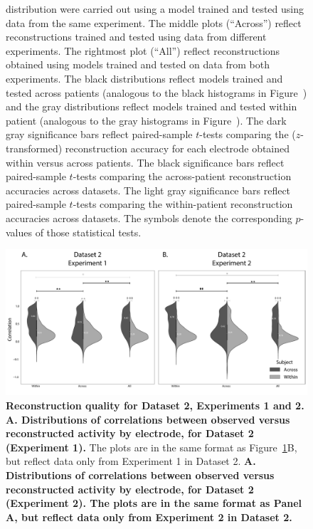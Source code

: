 \documentclass[10pt]{article}
\begin{document}
\begin{figure}[p]
{  distribution were carried out using a model trained and tested using
  data from the same experiment.  The middle plots (``Across'')
  reflect reconstructions trained and tested using data from different
  experiments.  The rightmost plot (``All'') reflect reconstructions
  obtained using models trained and tested on data from both
  experiments.  The black distributions reflect models trained and
  tested across patients (analogous to the black histograms in
  Figure~\corrmaps) and the gray distributions reflect models trained
  and tested within patient (analogous to the gray histograms in
  Figure~\corrmaps).  The dark gray significance bars reflect
  paired-sample $t$-tests comparing the ($z$-transformed)
  reconstruction accuracy for each electrode obtained within versus
  across patients.  The black significance bars reflect paired-sample
  $t$-tests comparing the across-patient reconstruction accuracies
  across datasets.  The light gray significance bars reflect
  paired-sample $t$-tests comparing the within-patient reconstruction
  accuracies across datasets.  The symbols denote the corresponding
  $p$-values of those statistical tests.}
\label{fig:supplemental_1}
\end{figure}


\begin{figure}[p]
\centering
\includegraphics[width=\textwidth]{figs/supplemental_2}
\caption{\textbf{Reconstruction quality for Dataset 2, Experiments 1
    and 2.}  \textbf{A. Distributions of correlations between observed
    versus reconstructed activity by electrode, for Dataset 2
    (Experiment 1).}  The plots are in the same format as
  Figure~\ref{fig:supplemental_1}B, but reflect data only from
  Experiment 1 in Dataset 2.  \textbf{A. Distributions of correlations between observed
    versus reconstructed activity by electrode, for Dataset 2
    (Experiment 2).  The plots are in the same format as Panel A, but
    reflect data only from Experiment 2 in Dataset 2.}} 
\label{fig:supplemental_2}
\end{figure}
\end{document}
